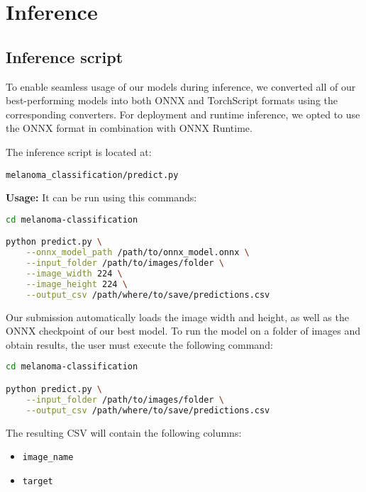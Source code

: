 \chapter{Inference}
\label{ch:inference}

\section{Inference script}
To enable seamless usage of our models during inference, we converted all of our best-performing models into both ONNX and TorchScript formats using the corresponding converters. For deployment and runtime inference, we opted to use the ONNX format in combination with ONNX Runtime.

The inference script is located at:

\begin{verbatim}
melanoma_classification/predict.py
\end{verbatim}


\textbf{Usage:}
It can be run using this commands:

\begin{lstlisting}[language=bash, caption={Run ONNX-based inference}, label={lst:onnx_inference}]
cd melanoma-classification

python predict.py \
    --onnx_model_path /path/to/onnx_model.onnx \
    --input_folder /path/to/images/folder \
    --image_width 224 \
    --image_height 224 \
    --output_csv /path/where/to/save/predictions.csv
\end{lstlisting}

Our submission automatically loads the image width and height, as well as the ONNX checkpoint of our best model. To run the model on a folder of images and obtain results, the user must execute the following command:

\begin{lstlisting}[language=bash, caption={LUMEN submssion inference command}, label={lst:onnx_inference}]
cd melanoma-classification

python predict.py \
    --input_folder /path/to/images/folder \
    --output_csv /path/where/to/save/predictions.csv
\end{lstlisting}


The resulting CSV will contain the following columns:
\begin{itemize}
    \item \texttt{image\_name}
    \item \texttt{target}
\end{itemize}


